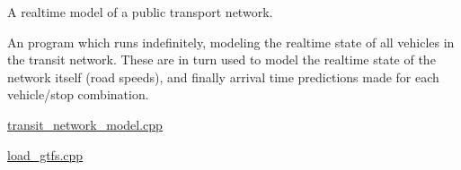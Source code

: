 A realtime model of a public transport network.

An program which runs indefinitely, modeling the realtime state of all vehicles in the transit network. These are in turn used to model the realtime state of the network itself (road speeds), and finally arrival time predictions made for each vehicle/stop combination.


\begin{DoxyItemize}
\item \hyperlink{transit__network__model_8cpp}{transit\+\_\+network\+\_\+model.\+cpp}
\item \hyperlink{load__gtfs_8cpp}{load\+\_\+gtfs.\+cpp} 
\end{DoxyItemize}